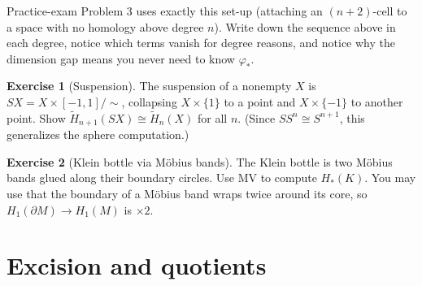 \documentclass[11pt]{article}
\newcommand{\Hred}{\tilde H}
\theoremstyle{definition}
\newtheorem{exercise}{Exercise}[section]
\begin{document}
\begin{note}
Practice-exam Problem 3 uses exactly this set-up (attaching an $(n+2)$-cell to a space with no homology above degree $n$). Write down the sequence above in each degree, notice which terms vanish for degree reasons, and notice why the dimension gap means you never need to know $\varphi_*$.
\end{note}

\begin{exercise}[Suspension]\label{exr:susp}
The suspension of a nonempty $X$ is $SX=X\times[-1,1]/\!\sim$, collapsing $X\times\{1\}$ to a point and $X\times\{-1\}$ to another point. Show $\Hred_{n+1}(SX)\cong\Hred_n(X)$ for all $n$. (Since $SS^n\cong S^{n+1}$, this generalizes the sphere computation.)
\end{exercise}

\begin{exercise}[Klein bottle via Möbius bands]\label{exr:mobius}
The Klein bottle is two Möbius bands glued along their boundary circles. Use MV to compute $H_*(K)$. You may use that the boundary of a Möbius band wraps twice around its core, so $H_1(\partial M)\to H_1(M)$ is $\times2$.
\end{exercise}

\section{Excision and quotients}\label{sec:excision}
\end{document}
